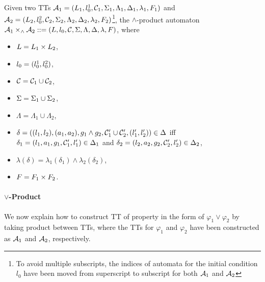         \begin{definition}
            Given two TTs $\mathcal{A}_1=(L_1,l_0^1,\mathcal{C}_1,\Sigma_1,\Lambda_1,\Delta_1,\allowbreak\lambda_1,F_1)$ and $\mathcal{A}_2=(L_2,l_0^2,\mathcal{C}_2,\Sigma_2,\Lambda_2,\Delta_2,\lambda_2,F_2)$\footnote{To avoid multiple subscripts, the indices of automata for the initial condition $l_0$ have been moved from superscript to subscript for both $\mathcal{A}_1$ and $\mathcal{A}_2$}, the $\land$-product automaton $\mathcal{A}_1\times_{\land}\mathcal{A}_2\mathrel{::=} (L,l_0,\mathcal{C},\Sigma,\Lambda,\Delta,\lambda,F)$, where
            \begin{itemize}
                \item $L = L_1 \times L_2$,
                \item $l_0 = (l_0^1,l_0^2)$,
                \item $\mathcal{C} = \mathcal{C}_1 \cup \mathcal{C}_2$,
                \item $\Sigma = \Sigma_1 \cup \Sigma_2$,
                \item $\Lambda = \Lambda_1 \cup \Lambda_2$,
                \item $\delta = \left((l_1,l_2),(a_1,a_2),g_1 \land g_2,\mathcal{C}_1'\cup\mathcal{C}_2',(l_1',l_2')\right) \in \Delta$ iff \\ 
                $\delta_1 = (l_1,a_1,g_1,\mathcal{C}_1',l_1')\in \Delta_1$ and $\delta_2 =(l_2,a_2,g_2,\mathcal{C}_2',l_2')\in \Delta_2$,
                \item $\lambda(\delta) = \lambda_1(\delta_1)\land\lambda_2(\delta_2) $,
                \item $F = F_1\times F_2$.
            \end{itemize}
        \end{definition}

        \paragraph{$\lor$-Product} We now explain how to construct TT of property in the form of $\varphi_1\lor\varphi_2$ by taking product between TTs, where the TTs for $\varphi_1$ and $\varphi_2$ have been constructed as $\mathcal{A}_1$ and $\mathcal{A}_2$, respectively.

